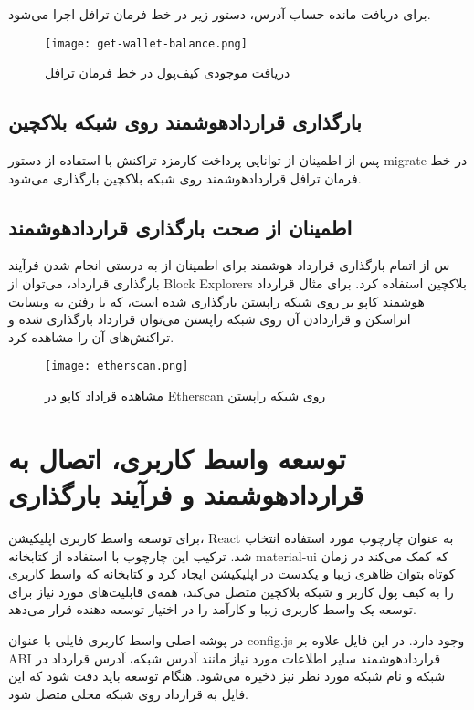 برای دریافت مانده حساب آدرس، دستور زیر در خط فرمان ترافل اجرا می‌شود.

\begin{figure}[ht]
\centerline{\texttt{[image: get-wallet-balance.png]}}
\caption{دریافت موجودی کیف‌پول در خط فرمان ترافل}
\label{fig:get-wallet-balance}
\end{figure}


\subsection{بارگذاری قراردادهوشمند روی شبکه بلاکچین}
پس از اطمینان از توانایی پرداخت کارمزد تراکنش با استفاده از دستور migrate در خط فرمان ترافل قراردادهوشمند روی شبکه بلاکچین بارگذاری می‌شود.


\subsection{اطمینان از صحت بارگذاری قراردادهوشمند}
س از اتمام بارگذاری قرارداد هوشمند برای اطمینان از به درستی انجام شدن فرآیند بارگذاری قرارداد، می‌توان از
\glspl{Block Explorer}
بلاکچین استفاده کرد. برای مثال قرارداد هوشمند کاپو بر روی شبکه راپستن بارگذاری شده است، که با رفتن به وبسایت اتراسکن
و قراردادن آن روی شبکه راپستن می‌توان قرارداد بارگذاری شده و تراکنش‌های آن را مشاهده کرد.


\begin{figure}[ht]
\centerline{\texttt{[image: etherscan.png]}}
\caption{مشاهده قراداد کاپو در Etherscan روی شبکه راپستن}
\label{fig:etherscan}
\end{figure}


\section{توسعه واسط کاربری، اتصال به قراردادهوشمند و فرآیند بارگذاری}
برای توسعه واسط کاربری اپلیکیشن، React به عنوان چارچوب مورد استفاده انتخاب شد. ترکیب این چارچوب با استفاده از کتابخانه material-ui که کمک می‌کند در زمان کوتاه بتوان ظاهری زیبا و یکدست در اپلیکیشن ایجاد کرد و کتابخانه
که واسط کاربری را به کیف پول کاربر و شبکه بلاکچین متصل می‌کند، همه‌ی قابلیت‌های مورد نیاز برای توسعه یک واسط کاربری زیبا و کارآمد را در اختیار توسعه دهنده قرار می‌دهد.

در پوشه اصلی واسط کاربری فایلی با عنوان config.js وجود دارد. در این فایل علاوه بر ABI قراردادهوشمند سایر اطلاعات مورد نیاز مانند آدرس شبکه، آدرس قرارداد در شبکه و نام شبکه مورد نظر نیز ذخیره می‌شود. هنگام توسعه باید دقت شود که این فایل به قرارداد روی شبکه محلی متصل شود.

